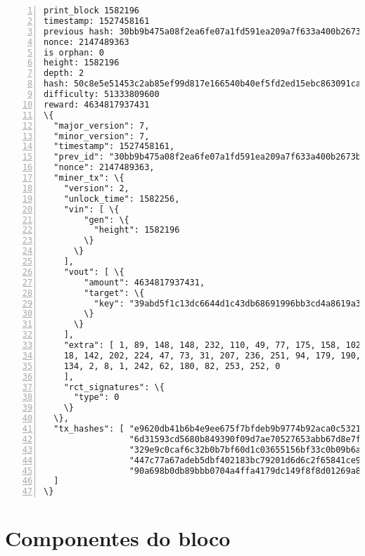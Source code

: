 \begin{appendices}
\begin{Verbatim}[commandchars=\\\{\}, numbers=left]
print_block 1582196
timestamp: 1527458161
previous hash: 30bb9b475a08f2ea6fe07a1fd591ea209a7f633a400b2673b8835a975348b0eb
nonce: 2147489363
is orphan: 0
height: 1582196
depth: 2
hash: 50c8e5e51453c2ab85ef99d817e166540b40ef5fd2ed15ebc863091ca2a04594
difficulty: 51333809600
reward: 4634817937431
\{
  "major_version": 7,
  "minor_version": 7,
  "timestamp": 1527458161,
  "prev_id": "30bb9b475a08f2ea6fe07a1fd591ea209a7f633a400b2673b8835a975348b0eb",
  "nonce": 2147489363,
  "miner_tx": \{
    "version": 2,
    "unlock_time": 1582256,
    "vin": [ \{
        "gen": \{
          "height": 1582196
        \}
      \}
    ],
    "vout": [ \{
        "amount": 4634817937431,
        "target": \{
          "key": "39abd5f1c13dc6644d1c43db68691996bb3cd4a8619a37a227667cf2bf055401"
        \}
      \}
    ],
    "extra": [ 1, 89, 148, 148, 232, 110, 49, 77, 175, 158, 102, 45, 72, 201, 193,
    18, 142, 202, 224, 47, 73, 31, 207, 236, 251, 94, 179, 190, 71, 72, 251, 110, 
    134, 2, 8, 1, 242, 62, 180, 82, 253, 252, 0
    ],
    "rct_signatures": \{
      "type": 0
    \}
  \},
  "tx_hashes": [ "e9620db41b6b4e9ee675f7bfdeb9b9774b92aca0c53219247b8f8c7aecf773ae",
                 "6d31593cd5680b849390f09d7ae70527653abb67d8e7fdca9e0154e5712591bf",
                 "329e9c0caf6c32b0b7bf60d1c03655156bf33c0b09b6a39889c2ff9a24e94a54",
                 "447c77a67adeb5dbf402183bc79201d6d6c2f65841ce95cf03621da5a6bffefc",
                 "90a698b0db89bbb0704a4ffa4179dc149f8f8d01269a85f46ccd7f0007167ee4"
  ]
\}
\end{Verbatim}



\section*{Componentes do bloco}


\end{appendices}
